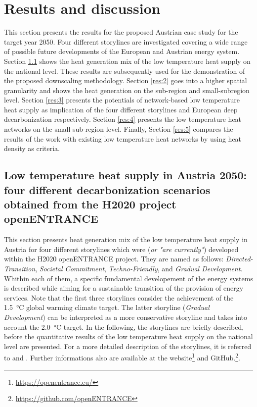 \section{Results and discussion}



This section presents the results for the proposed Austrian case study for the target year 2050. Four different storylines are investigated covering a wide range of possible future developments of the European and Austrian energy system. Section \ref{res:1} shows the heat generation mix of the low temperature heat supply on the national level. These results are subsequently used for the demonstration of the proposed downscaling methodology. Section \ref{res:2} goes into a higher spatial granularity and shows the heat generation on the sub-region and small-subregion level. Section \ref{res:3} presents the potentials of network-based low temperature heat supply as implication of the four different storylines and European deep decarbonization respectively. Section \ref{res:4} presents the low temperature heat networks on the small sub-region level. Finally, Section \ref{res:5} compares the results of the work with existing low temperature heat networks by using heat density as criteria.

\subsection{Low temperature heat supply in Austria 2050: four different decarbonization scenarios obtained from the H2020 project openENTRANCE}\label{res:1}
This section presents heat generation mix of the low temperature heat supply in Austria for four different storylines which were (\textit{or "are currently"}) developed within the H2020 openENTRANCE project. They are named as follows: \textit{Directed-Transition}, \textit{Societal Commitment}, \textit{Techno-Friendly}, and \textit{Gradual Development}. Whithin each of them, a specific fundamental developement of the energy systems is described while aiming for a sustainable transition of the provision of energy services. Note that the first three storylines consider the achievement of the \SI{1.5}{\degreeCelsius} global warming climate target. The latter storyline (\textit{Gradual Development}) can be interpreted as a more conservative storyline and takes into account the \SI{2.0}{\degreeCelsius} target. In the following, the storylines are briefly described, before the quantitative results of the low temperature heat supply on the national level are presented. For a more detailed description of the storylines, it is referred to \cite{auer2020quantitative} and \cite{auer2020development}. Further informations also are available at the website\footnote{\url{https://openentrance.eu/}} and GitHub.\footnote{\url{https://github.com/openENTRANCE}}.\newline

